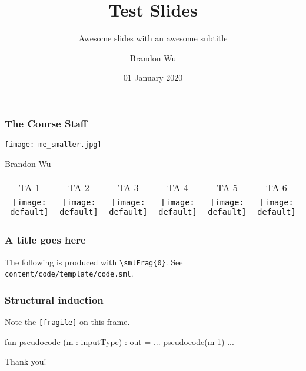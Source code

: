 \documentclass[aspectratio=169]{beamer}
\title{Test Slides} %
\subtitle{Awesome slides with an awesome subtitle} %
\date{01 January 2020} %
\author{Brandon Wu} %
\newif\ifcolorlambda
\begin{document}
    \ifweb
       \renewcommand{\pause}{}
    \fi


{
\begin{frame}[plain]
    \colorlambdatrue
    \titlepage
\end{frame}
}

\begin{frame}[fragile]
    \frametitle{The Course Staff}

    \begin{center} \texttt{[image: me\_smaller.jpg]} \end{center}
    \begin{center} \Large Brandon Wu \end{center}
    
    \vspace{\fill}

    \begin{center}\begin{tabular}{c c c c c c}
      TA 1 & TA 2 & TA 3 & TA 4 & TA 5 & TA 6 \\  
      \texttt{[image: default]} &
      \texttt{[image: default]} &
      \texttt{[image: default]} &
      \texttt{[image: default]} &
      \texttt{[image: default]} &
      \texttt{[image: default]} \\
    \end{tabular}\end{center}
\end{frame}

\begin{frame}
    \frametitle{A title goes here}
    The following is produced with \texttt{\textbackslash smlFrag\{0\}}. See \texttt{content/code/template/code.sml}. \pause

\end{frame}

\begin{frame}[fragile]
    \frametitle{Structural induction}
    Note the \texttt{[fragile]} on this frame.\pause

    \begin{codeblock}
       fun pseudocode (m : inputType) : out = 
                 ... 
             pseudocode(m-1) 
                 ... 
    \end{codeblock}
\end{frame}

\begin{frame}
	\begin{center} Thank you! \end{center}
\end{frame}
\end{document}

